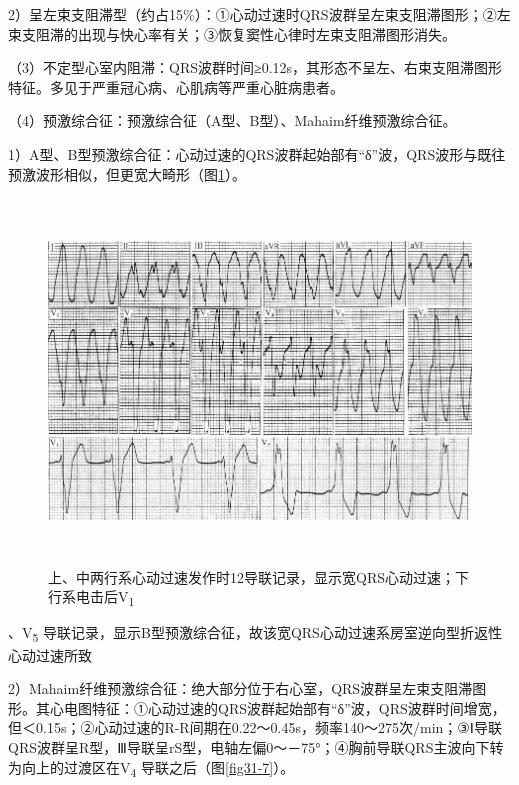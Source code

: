 2）呈左束支阻滞型（约占15\%）：①心动过速时QRS波群呈左束支阻滞图形；②左束支阻滞的出现与快心率有关；③恢复窦性心律时左束支阻滞图形消失。

（3）不定型心室内阻滞：QRS波群时间≥0.12s，其形态不呈左、右束支阻滞图形特征。多见于严重冠心病、心肌病等严重心脏病患者。

（4）预激综合征：预激综合征（A型、B型）、Mahaim纤维预激综合征。

1）A型、B型预激综合征：心动过速的QRS波群起始部有“δ”波，QRS波形与既往预激波形相似，但更宽大畸形（图\ref{fig31-6}）。

\begin{figure}[!htbp]
 \centering
 \includegraphics[width=5.79167in,height=3.80208in]{./images/Image00509.jpg}
 \captionsetup{justification=centering}
 \caption{上、中两行系心动过速发作时12导联记录，显示宽QRS心动过速；下行系电击后V\textsubscript{1}}
 \label{fig31-6}
  \end{figure} 
、V\textsubscript{5}
导联记录，显示B型预激综合征，故该宽QRS心动过速系房室逆向型折返性心动过速所致

2）Mahaim纤维预激综合征：绝大部分位于右心室，QRS波群呈左束支阻滞图形。其心电图特征：①心动过速的QRS波群起始部有“δ”波，QRS波群时间增宽，但＜0.15s；②心动过速的R-R间期在0.22～0.45s，频率140～275次/min；③Ⅰ导联QRS波群呈R型，Ⅲ导联呈rS型，电轴左偏0～－75°；④胸前导联QRS主波向下转为向上的过渡区在V\textsubscript{4}
导联之后（图\ref{fig31-7}）。

